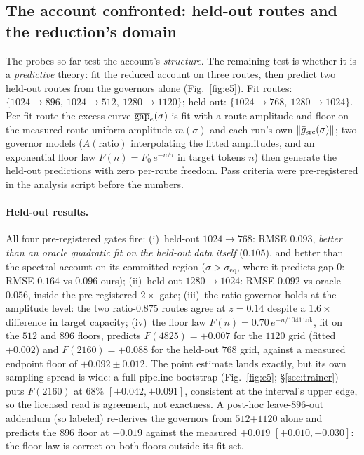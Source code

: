 \subsection{The account confronted: held-out routes and the reduction's
domain}
\label{sec:confronted}

The probes so far test the account's \emph{structure}. The remaining
test is whether it is a \emph{predictive} theory: fit the reduced
account on three routes, then predict two held-out routes from
the governors alone (Fig.~\ref{fig:e5}). Fit routes: $\{1024{\to}896,\ 1024{\to}512,\ 1280{\to}1120\}$;
held-out: $\{1024{\to}768,\ 1280{\to}1024\}$. Per fit route the excess
curve $\overline{\mathrm{gap}}_e(\sigma)$ is fit with a route amplitude and floor on
the measured route-uniform amplitude $m(\sigma)$ and each run's own
$\|\bar g_{\mathrm{src}}(\sigma)\|$;
two governor models ($A(\mathrm{ratio})$ interpolating the fitted
amplitudes, and an exponential floor law $F(n) = F_0\,e^{-n/\tau}$ in
target tokens $n$) then generate the held-out predictions with zero
per-route freedom. Pass criteria were pre-registered in the analysis
script before the numbers.

\paragraph{Held-out results.}
All four pre-registered gates fire:
(i)~held-out $1024{\to}768$: RMSE $0.093$, \emph{better than an
oracle quadratic fit on the held-out data itself} ($0.105$), and better
than the spectral account on its committed region
($\sigma > \sigma_{\mathrm{eq}}$,
where it predicts gap $0$: RMSE $0.164$ vs $0.096$ ours);
(ii)~held-out $1280{\to}1024$: RMSE $0.092$ vs oracle $0.056$, inside
the pre-registered $2\times$ gate;
(iii)~the ratio governor holds at the amplitude level: the two
ratio-$0.875$ routes agree at $z = 0.14$ despite a $1.6\times$
difference in target capacity;
(iv)~the floor law $F(n) = 0.70\,e^{-n/1041\,\mathrm{tok}}$, fit on the
$512$ and $896$ floors, predicts $F(4825) = +0.007$ for the $1120$ grid
(fitted $+0.002$) and $F(2160) = +0.088$ for the held-out $768$ grid,
against a measured endpoint floor of $+0.092 \pm 0.012$. The point
estimate lands exactly, but its own sampling spread is wide: a
full-pipeline bootstrap (Fig.~\ref{fig:e5}; \S\ref{sec:trainer}) puts
$F(2160)$ at $68\%$ $[+0.042, +0.091]$, consistent at the interval's
upper edge, so the licensed read is agreement, not exactness. A
post-hoc leave-$896$-out addendum (so labeled) re-derives the governors
from $512$+$1120$ alone and predicts the $896$ floor at $+0.019$ against
the measured $+0.019$ $[+0.010, +0.030]$: the floor law is correct on
both floors outside its fit set.

